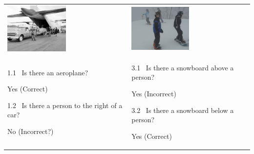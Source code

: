 \begin{table}
\begin{tabular}{p{}p{}}
\def\arraystretch{1.5}

	\includegraphics[width=0.5\textwidth]{vqa1.jpg} &
	\includegraphics[width=0.5\textwidth]{vqa3.jpg} \\
	1.1 \ Is there an aeroplane?

	\qquad Yes (Correct)

	1.2 \ Is there a person to the right of a car?

	\qquad No (Incorrect?) &

	3.1 \ Is there a snowboard above a person?

	\qquad Yes (Incorrect)

	3.2 \ Is there a snowboard below a person?

	\qquad Yes (Correct) \\[1.5em]


\end{tabular}
\end{table}
